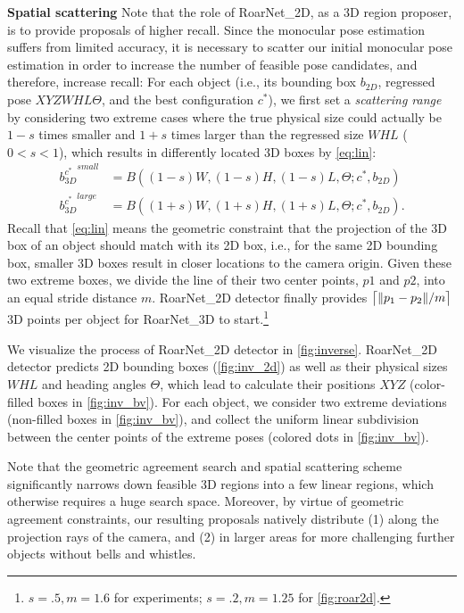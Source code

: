\documentclass[letterpaper, 10 pt, conference]{ieeeconf}
\DeclarePairedDelimiter{\ceil}{\lceil}{\rceil}
\newcommand{\subsec}{\quad}
\begin{document}
\textbf{Spatial scattering\subsec}
Note that the role of RoarNet\_2D, as a 3D region proposer, is to provide proposals of higher recall.
Since the monocular pose estimation suffers from limited accuracy, it is necessary to scatter our initial monocular pose estimation in order to increase the number of feasible pose candidates, and therefore, increase recall: For each object (i.e., its bounding box $b_{2D}$, regressed pose $XYZWHL\Theta$, and the best configuration $c^*$),
we first set a \emph{scattering range} by considering two extreme cases where the true physical size could actually be $1-s$ times smaller and $1+s$ times larger than the regressed size $WHL$ ($0<s<1$), which results in differently located 3D boxes by \cref{eq:lin}:
\begin{align*}
{b_{3D}^{c^*}}^{small} &= B((1-s)W,(1-s)H,(1-s)L,\Theta; c^{*}, b_{2D})\\
{b_{3D}^{c^*}}^{large} &= B((1+s)W,(1+s)H,(1+s)L,\Theta; c^{*}, b_{2D}).
\end{align*}
Recall that \cref{eq:lin} means the geometric constraint that the projection of the 3D box of an object should match with its 2D box, i.e., for the same 2D bounding box, smaller 3D boxes result in closer locations to the camera origin. Given these two extreme boxes, we divide the line of their two center points, $p1$ and $p2$, into an equal stride distance $m$. RoarNet\_2D detector finally provides $\ceil[\big]{\|p_1-p_2\|/m}$ 3D points per object for RoarNet\_3D to start.\footnote{$s=.5, m=1.6$ for experiments; $s=.2, m=1.25$ for \cref{fig:roar2d}.}

We visualize the process of RoarNet\_2D detector in \cref{fig:inverse}. RoarNet\_2D detector predicts 2D bounding boxes (\cref{fig:inv_2d}) as well as their physical sizes $WHL$ and heading angles $\Theta$, which lead to calculate their positions $XYZ$ (color-filled boxes in \cref{fig:inv_bv}). For each object, we consider two extreme deviations (non-filled boxes in \cref{fig:inv_bv}), and collect the uniform linear subdivision between the center points of the extreme poses (colored dots in \cref{fig:inv_bv}).

Note that the geometric agreement search and spatial scattering scheme significantly narrows down feasible 3D regions into a few linear regions, which otherwise requires a huge search space. Moreover, by virtue of geometric agreement constraints, our resulting proposals natively distribute (1) along the projection rays of the camera, and (2) in larger areas for more challenging further objects without bells and whistles.
\end{document}

